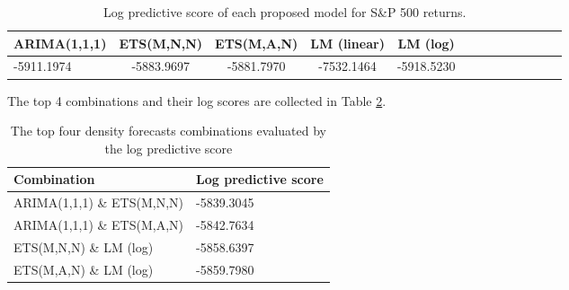\documentclass{monashthesis}
\begin{document}
\begin{table}[htbp!]
\centering
\caption{Log predictive score of each proposed model for S\&P 500 returns.}
\begin{tabular}{l*{4}{c}cccccccc}
\hline
     ARIMA(1,1,1) & ETS(M,N,N) & ETS(M,A,N) & LM (linear) & LM (log) \\
    \hline
     -5911.1974 & -5883.9697  & -5881.7970 & -7532.1464 & -5918.5230\\
    \hline
\end{tabular}
\label{tab:1}
\end{table}

The top 4 combinations and their log scores are collected in Table \ref{tab:3}.

\begin{table}[ht]
  \centering
  \caption{The top four density forecasts combinations evaluated by the log predictive score}
    \begin{tabular}{ll}
    \toprule
    Combination & Log predictive score \\
    \midrule
    ARIMA(1,1,1) \& ETS(M,N,N) & -5839.3045 \\
    ARIMA(1,1,1) \& ETS(M,A,N) & -5842.7634 \\
    ETS(M,N,N) \&  LM (log) & -5858.6397 \\
    ETS(M,A,N) \&  LM (log) & -5859.7980 \\
    \bottomrule
    \end{tabular}
  \label{tab:3}
\end{table}

\printbibliography[title={Reference}]
\end{document}
